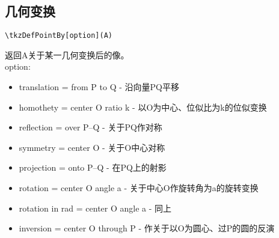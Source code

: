 \documentclass[UTF8]{ctexart}
\begin{document}
\subsection{几何变换}
\begin{lstlisting}
\tkzDefPointBy[option](A)
\end{lstlisting}
返回A关于某一几何变换后的像。\\
option:
\begin{itemize}
	\item translation = from P to Q - 沿向量PQ平移
	\item homothety = center O ratio k - 以O为中心、位似比为k的位似变换
	\item reflection = over P--Q - 关于PQ作对称
	\item symmetry = center O - 关于O中心对称
	\item projection = onto P--Q - 在PQ上的射影
	\item rotation = center O angle a - 关于中心O作旋转角为a的旋转变换
	\item rotation in rad = center O angle a - 同上
	\item inversion = center O through P - 作关于以O为圆心、过P的圆的反演
\end{itemize}
\end{document}
